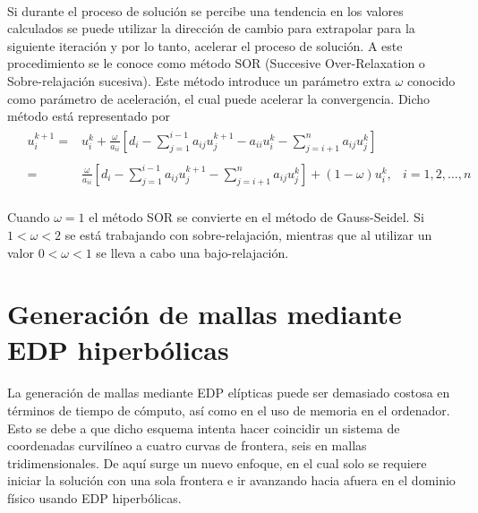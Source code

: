 \documentclass[letterpaper, openright, 12pt]{book}
\begin{document}
			\paragraph*{}
				Si durante el proceso de solución se percibe una tendencia en los valores calculados se puede utilizar la dirección de cambio para extrapolar para la siguiente iteración y por lo tanto, acelerar el proceso de solución. A este procedimiento se le conoce como método SOR (Succesive Over-Relaxation o  Sobre-relajación sucesiva). Este método introduce un parámetro extra $\omega$ conocido como parámetro de aceleración, el cual puede acelerar la convergencia. Dicho método está representado por
				\begin{align}
					&\begin{aligned}
						u_{i}^{k+1} =& u_{i}^{k} + \frac{\omega}{a_{ii}} \left[ d_{i} - \sum_{j = 1}^{i - 1}a_{ij}u_{j}^{k+1} - a_{ii}u_{i}^{k} - \sum_{j = i+1}^{n} a_{ij}u_{j}^{k} \right]
						\\ \\
						=& \frac{\omega}{a_{ii}} \left[ d_{i} - \sum_{j = 1}^{i - 1} a_{ij}u_{j}^{k+1} - \sum_{j = i+1}^{n} a_{ij}u_j ^{k}\right] + \left( 1 - \omega \right) u_{i}^{k}, &i = 1, 2, \dotsc, n
					\end{aligned}
				\end{align}
			
			\paragraph*{}
				Cuando $\omega = 1$ el método SOR se convierte en el método de Gauss-Seidel. Si $1 < \omega < 2$ se está trabajando con sobre-relajación, mientras que al utilizar un valor $0 < \omega < 1$ se lleva a cabo una bajo-relajación.
	
	\section{Generación de mallas mediante EDP hiperbólicas}
	\paragraph*{}
		La generación de mallas mediante EDP elípticas puede ser demasiado costosa en términos de tiempo de cómputo, así como en el uso de memoria en el ordenador. Esto se debe a que dicho esquema intenta hacer coincidir un sistema de coordenadas curvilíneo a cuatro curvas de frontera, seis en mallas tridimensionales. De aquí surge un nuevo enfoque, en el cual solo se requiere iniciar la solución con una sola frontera e ir avanzando hacia afuera en el dominio físico usando EDP hiperbólicas. \cite{farrashkhalvat}
	
\end{document}
